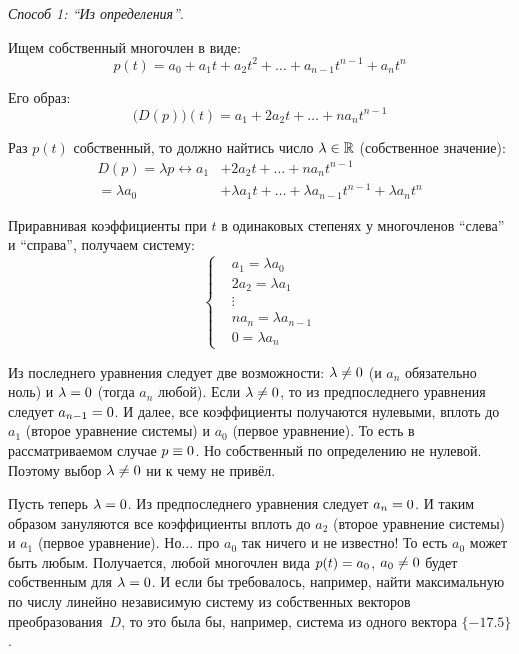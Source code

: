 \documentclass[a4paper,12pt]{article}
\begin{document}
  \begin{solution}
    \hfill\par
    \emph{Способ 1: ``Из определения''}.
    
    Ищем собственный многочлен в виде:
    \begin{equation}\label{eq:p24-42-p-t}
      p(t) = a_0 + a_1 t + a_2 t^2 + \ldots + a_{n - 1} t^{n - 1} + a_n t^n
    \end{equation}
    
    Его образ:
    \[
      \bigl(D(p)\bigr)(t) = a_1 + 2 a_2 t + \ldots + n a_n t^{n - 1}
    \]
    
    Раз $p(t)$ собственный, то должно найтись число $\lambda \hm\in \RR$ (собственное значение):
    \begin{equation}
    \begin{split}
      D(p) = \lambda p
        \leftrightarrow a_1 &+ 2 a_2 t + \ldots + n a_n t^{n - 1}\\
                      = \lambda a_0 &+ \lambda a_1 t + \ldots + \lambda a_{n - 1} t^{n - 1} + \lambda a_n t^n
    \end{split}
    \end{equation}
    
    Приравнивая коэффициенты при $t$ в одинаковых степенях у многочленов ``слева'' и ``справа'', получаем систему:
    \[
      \left\{
        \begin{aligned}
          &a_1 = \lambda a_0\\
          &2 a_2 = \lambda a_1\\
          &\vdots\\
          &n a_n = \lambda a_{n - 1}\\
          &0 = \lambda a_n
        \end{aligned}
      \right.
    \]
    
    Из последнего уравнения следует две возможности: $\lambda \hm{\not=} 0$ (и $a_n$ обязательно ноль) и $\lambda \hm= 0$ (тогда $a_n$ любой).
    Если $\lambda \hm{\not=} 0$, то из предпоследнего уравнения следует $a_{n - 1} \hm= 0$.
    И далее, все коэффициенты получаются нулевыми, вплоть до $a_1$ (второе уравнение системы) и $a_0$ (первое уравнение).
    То есть в рассматриваемом случае $p \hm\equiv 0$.
    Но собственный по определению не нулевой.
    Поэтому выбор $\lambda \hm{\not=} 0$ ни к чему не привёл.
    
    Пусть теперь $\lambda \hm= 0$.
    Из предпоследнего уравнения следует $a_n \hm= 0$.
    И таким образом зануляются все коэффициенты вплоть до $a_2$ (второе уравнение системы) и $a_1$ (первое уравнение).
    Но... про $a_0$ так ничего и не известно!
    То есть $a_0$ может быть любым.
    Получается, любой многочлен вида $p(t) \hm= a_0$, $a_0 \hm{\not=} 0$ будет собственным для $\lambda \hm= 0$.
    И если бы требовалось, например, найти максимальную по числу линейно независимую систему из собственных векторов преобразования~$D$, то это была бы, например, система из одного вектора $\{-17.5\}$.
    

\end{solution}
\end{document}
